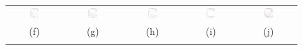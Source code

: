 \begin{figure}[t]
\begin{tabular}{@{}c c c c c@{}}
\includegraphics[width=0.18\textwidth]{figs/synthetic/syn_lines_gabor_scales_0} &
\includegraphics[width=0.18\textwidth]{figs/synthetic/syn_lines_gabor_scales_1} &
\includegraphics[width=0.18\textwidth]{figs/synthetic/syn_lines_gabor_scales_2} &
\includegraphics[width=0.18\textwidth]{figs/synthetic/syn_lines_gabor_scales_3} &
\includegraphics[width=0.18\textwidth]{figs/retina/ret_vessels_gabor_scales} \\
(f) & (g) & (h) & (i) & (j)\\
\noalign{\smallskip}


\end{tabular}
\end{figure}
